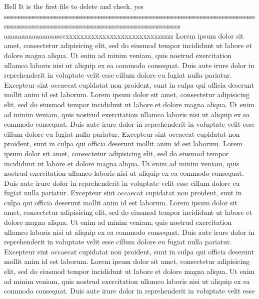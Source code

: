 Hell
It is the
first file
to delete and check, yes
\begin{equation}
    
\end{equation}
sssssssssssssssssssssssssssssssssssssssssssssssssssssssssssssssssssssssssssssssssssssssssssssssssssssssssssssssssssssssssssssssssssssssssssssssssssssssssss aaaaaaaaaaaaaaasccxxxxxxxxxxxxxxxxxxxxxxxxxzzzzz
       Lorem ipsum dolor sit amet, consectetur adipisicing elit, sed do eiusmod
       tempor incididunt ut labore et dolore magna aliqua. Ut enim ad minim veniam,
       quis nostrud exercitation ullamco laboris nisi ut aliquip ex ea commodo
       consequat. Duis aute irure dolor in reprehenderit in voluptate velit esse
       cillum dolore eu fugiat nulla pariatur. Excepteur sint occaecat cupidatat non
proident, sunt in culpa qui officia deserunt mollit anim id est laborum.
Lorem ipsum dolor sit amet, consectetur adipisicing elit, sed do eiusmod
tempor incididunt ut labore et dolore magna aliqua. Ut enim ad minim veniam,
       quis nostrud exercitation ullamco laboris nisi ut aliquip ex ea commodo
       consequat. Duis aute irure dolor in reprehenderit in voluptate velit esse
       cillum dolore eu fugiat nulla pariatur. Excepteur sint occaecat cupidatat non
       proident, sunt in culpa qui officia deserunt mollit anim id est laborum.
       Lorem ipsum dolor sit amet, consectetur adipisicing elit, sed do eiusmod
       tempor incididunt ut labore et dolore magna aliqua. Ut enim ad minim veniam,
       quis nostrud exercitation ullamco laboris nisi ut aliquip ex ea commodo
       consequat. Duis aute irure dolor in reprehenderit in voluptate velit esse
       cillum dolore eu fugiat nulla pariatur. Excepteur sint occaecat cupidatat non
       proident, sunt in culpa qui officia deserunt mollit anim id est laborum.
       Lorem ipsum dolor sit amet, consectetur adipisicing elit, sed do eiusmod
       tempor incididunt ut labore et dolore magna aliqua. Ut enim ad minim veniam,
       quis nostrud exercitation ullamco laboris nisi ut aliquip ex ea commodo
       consequat. Duis aute irure dolor in reprehenderit in voluptate velit esse
       cillum dolore eu fugiat nulla pariatur. Excepteur sint occaecat cupidatat non
       proident, sunt in culpa qui officia deserunt mollit anim id est laborum.
       Lorem ipsum dolor sit amet, consectetur adipisicing elit, sed do eiusmod
       tempor incididunt ut labore et dolore magna aliqua. Ut enim ad minim veniam,
       quis nostrud exercitation ullamco laboris nisi ut aliquip ex ea commodo
       consequat. Duis aute irure dolor in reprehenderit in voluptate velit esse
